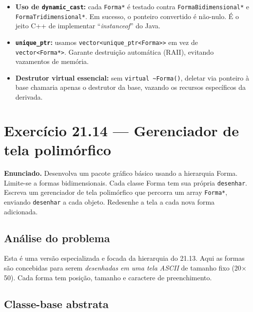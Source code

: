 \documentclass[11pt,a4paper]{article}
\begin{document}
\begin{itemize}[leftmargin=*]
  \item \textbf{Uso de \texttt{dynamic\_cast}:} cada \texttt{Forma*} \'e testado contra \texttt{FormaBidimensional*} e \texttt{FormaTridimensional*}. Em sucesso, o ponteiro convertido \'e n\~ao-nulo. \'E o jeito C++ de implementar ``\emph{instanceof}'' do Java.
  \item \textbf{\texttt{unique\_ptr}:} usamos \texttt{vector<unique\_ptr<Forma>>} em vez de \texttt{vector<Forma*>}. Garante destrui\c{c}\~ao autom\'atica (RAII), evitando vazamentos de mem\'oria.
  \item \textbf{Destrutor virtual essencial:} sem \texttt{virtual \~{}Forma()}, deletar via ponteiro \`a base chamaria apenas o destrutor da base, vazando os recursos espec\'ificos da derivada.
\end{itemize}

\newpage
\section{Exerc\'icio 21.14 --- Gerenciador de tela polim\'orfico}

\begin{enunciado}
\textbf{Enunciado.} Desenvolva um pacote gr\'afico b\'asico usando a hierarquia Forma. Limite-se a formas bidimensionais. Cada classe Forma tem sua pr\'opria \texttt{desenhar}. Escreva um gerenciador de tela polim\'orfico que percorra um array \texttt{Forma*}, enviando \texttt{desenhar} a cada objeto. Redesenhe a tela a cada nova forma adicionada.
\end{enunciado}

\subsection*{An\'alise do problema}

Esta \'e uma vers\~ao especializada e focada da hierarquia do 21.13. Aqui as formas s\~ao concebidas para serem \emph{desenhadas em uma tela ASCII} de tamanho fixo (20$\times$50). Cada forma tem posi\c{c}\~ao, tamanho e caractere de preenchimento.

\subsection*{Classe-base abstrata}
\end{document}

